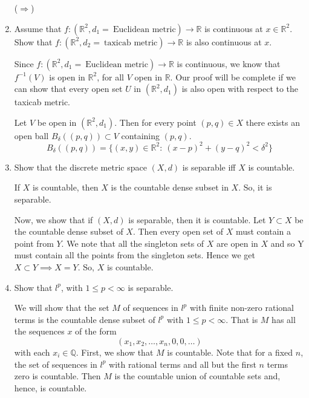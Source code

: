 \documentclass[12pt]{article}
\newcommand{\rl}{\mathbb{R}}
\newcommand{\mR}{\mathbb{R}}
\newcommand{\mQ}{\mathbb{Q}}
\begin{document}
\begin{enumerate}
\begin{mybox}
    \vspace*{3mm}
    ($\Longrightarrow$)

\end{mybox}
 
 
\item Assume that $f : (\mR^2, d_1 =  \
    \text{Euclidean metric}) \to \mR$ is continuous at
    $x \in \mR^2$. Show that
    $f : (\mR^2, d_2 =  \ \text{taxicab metric})
    \to \mR$ is also continuous at $x$.
\begin{mybox}

    Since $f : (\mR^2, d_1 =  \
    \text{Euclidean metric}) \to \mR$ is continuous,
    we know that $f^{-1}(V)$ is open in $\rl^2$, for all
    $V$ open in $\rl$. Our proof will be complete if we
    can show that every open set $U$ in $(\rl^2,d_1)$
    is also
    open with respect to the taxicab metric.

    \vspace*{3mm}
    Let $V$ be open in $(\mR^2, d_1)$. Then for
    every point $(p,q)\in X$ there exists an open ball
    $B_\delta((p,q))\subset V$ containing $(p,q)$.
    $$B_\delta((p,q))=\{(x,y)\in\mR^2:
    \ (x-p)^2+(y-q)^2<\delta^2\}$$
\end{mybox}

\item Show that the discrete metric space $(X,d)$ is
    separable iff $X$ is countable. 
\begin{mybox}

    If $X$ is countable, then $X$ is the countable
    dense subset in $X$. So, it is separable.

    \vspace*{3mm}
    Now, we show that if $(X,d)$ is separable, then
    it is countable. Let $Y\subset X$ be
    the countable dense subset of $X$.
    Then every open set of $X$ must contain a point
    from $Y$. We note that all the singleton sets of
    $X$ are open in $X$ and so Y must contain all the
    points from the singleton sets. Hence we get
    $X\subset Y\implies X=Y$. So, $X$ is countable.
\end{mybox}
 
\item Show that $l^p$, with $1 \leq p <
    \infty$ is separable.
\begin{mybox}

    We will show that the set $M$ of sequences in $l^p$
    with finite non-zero rational terms is
    the countable dense
    subset of $l^p$ with $1\leq p<\infty$. That is
    $M$ has all the sequences $x$ of the form
    $$(x_1,x_2,\ldots,x_n,0,0,\ldots)$$
    with each $x_i\in\mQ$.
    First, we show
    that $M$ is countable. Note that for a fixed $n$, the
    set of sequences in $l^p$ with rational terms
    and all but the first $n$
    terms zero is countable. Then $M$ is the countable
    union of countable sets and, hence, is countable.


\end{mybox}
\end{enumerate}
\end{document}
